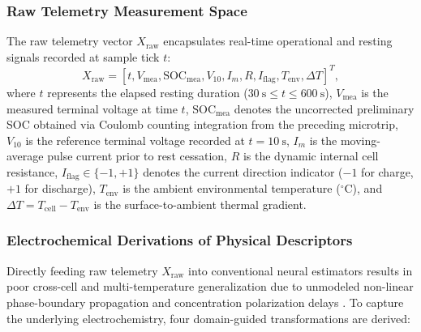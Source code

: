 \subsubsection{Raw Telemetry Measurement Space}
The raw telemetry vector $X_{\text{raw}}$ encapsulates real-time operational and resting signals recorded at sample tick $t$:
\begin{equation}
	\label{eq:raw_feature_vector}
	X_{\text{raw}} = \left[ t, V_{\text{mea}}, \text{SOC}_{\text{mea}}, V_{10}, I_m, R, I_{\text{flag}}, T_{\text{env}}, \Delta T \right]^T,
\end{equation}
where $t$ represents the elapsed resting duration ($30\ \text{s} \le t \le 600\ \text{s}$), $V_{\text{mea}}$ is the measured terminal voltage at time $t$, $\text{SOC}_{\text{mea}}$ denotes the uncorrected preliminary SOC obtained via Coulomb counting integration from the preceding microtrip, $V_{10}$ is the reference terminal voltage recorded at $t = 10\ \text{s}$, $I_m$ is the moving-average pulse current prior to rest cessation, $R$ is the dynamic internal cell resistance, $I_{\text{flag}} \in \{-1, +1\}$ denotes the current direction indicator ($-1$ for charge, $+1$ for discharge), $T_{\text{env}}$ is the ambient environmental temperature ($^\circ\text{C}$), and $\Delta T = T_{\text{cell}} - T_{\text{env}}$ is the surface-to-ambient thermal gradient.

\subsubsection{Electrochemical Derivations of Physical Descriptors}
Directly feeding raw telemetry $X_{\text{raw}}$ into conventional neural estimators results in poor cross-cell and multi-temperature generalization due to unmodeled non-linear phase-boundary propagation and concentration polarization delays \cite{sorouri2025breaking, wang2025lifepo4}. To capture the underlying electrochemistry, four domain-guided transformations are derived:


